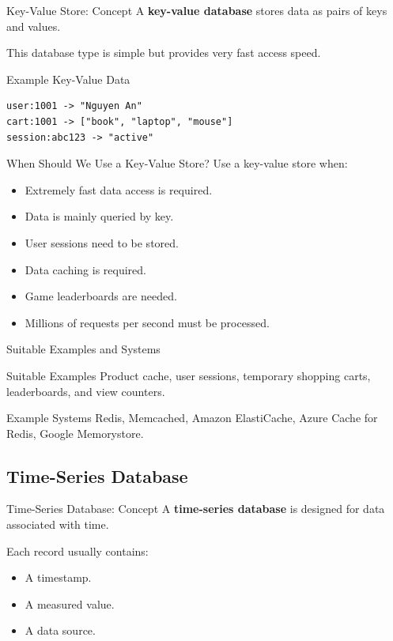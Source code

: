 \documentclass[aspectratio=169,11pt]{beamer}
\newcommand{\keyword}[1]{\textcolor{accent}{\textbf{#1}}}
\newcommand{\kw}[1]{\keyword{#1}}
\newcommand{\smallitem}{\setlength{\itemsep}{2pt}\setlength{\parskip}{0pt}}
\begin{document}
\begin{frame}{Key-Value Store: Concept}
A \kw{key-value database} stores data as pairs of keys and values.

\vspace{2mm}
This database type is simple but provides very fast access speed.
\end{frame}

\begin{frame}[fragile]{Example Key-Value Data}
\small
\begin{verbatim}
user:1001 -> "Nguyen An"
cart:1001 -> ["book", "laptop", "mouse"]
session:abc123 -> "active"
\end{verbatim}
\end{frame}

\begin{frame}{When Should We Use a Key-Value Store?}
Use a key-value store when:
\begin{itemize}
  \smallitem
  \item Extremely fast data access is required.
  \item Data is mainly queried by key.
  \item User sessions need to be stored.
  \item Data caching is required.
  \item Game leaderboards are needed.
  \item Millions of requests per second must be processed.
\end{itemize}
\end{frame}

\begin{frame}{Suitable Examples and Systems}
\begin{block}{Suitable Examples}
Product cache, user sessions, temporary shopping carts, leaderboards, and view counters.
\end{block}

\begin{block}{Example Systems}
Redis, Memcached, Amazon ElastiCache, Azure Cache for Redis, Google Memorystore.
\end{block}
\end{frame}

\subsection{Time-Series Database}

\begin{frame}{Time-Series Database: Concept}
A \kw{time-series database} is designed for data associated with time.

\vspace{2mm}
Each record usually contains:
\begin{itemize}
  \smallitem
  \item A timestamp.
  \item A measured value.
  \item A data source.
\end{itemize}
\end{frame}
\end{document}
